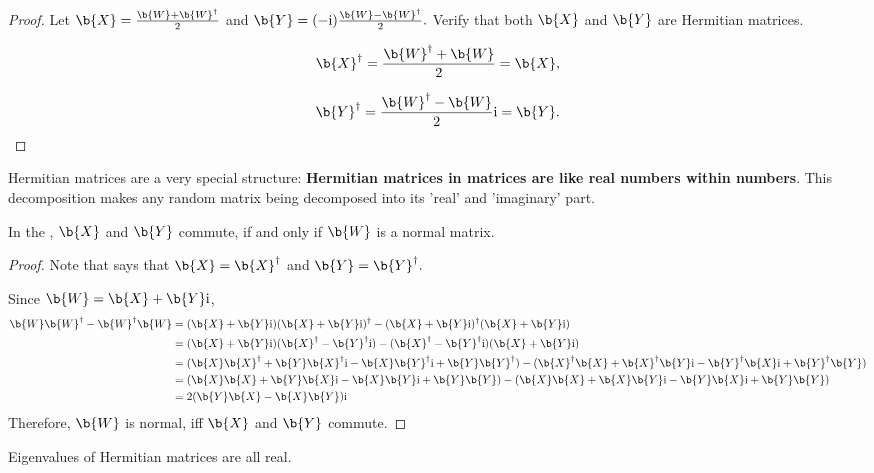 \begin{proof}
Let
$\b{X} = \frac{\b{W} + \b{W}^\dagger}{2}$ and 
$\b{Y} = (- \mathrm{i}) \frac{\b{W} - \b{W}^\dagger}{2}.$
Verify that both $\b{X}$ and $\b{Y}$ are Hermitian matrices.

$$\b{X}^\dagger = \frac{\b{W}^\dagger + \b{W}}{2} = \b{X},$$

$$\b{Y}^\dagger = \frac{\b{W}^\dagger - \b{W}}{2} \mathrm{i} = \b{Y}.$$
\end{proof}

\begin{remark}
Hermitian matrices are a very special structure:
\textbf{Hermitian matrices in matrices are like real numbers within numbers}.
This decomposition makes any random matrix being decomposed into its 'real' and 'imaginary' part.
\end{remark}

\begin{corollary}
In the , $\b{X}$ and $\b{Y}$ commute, if and only if $\b{W}$ is a normal matrix.
\end{corollary}

\begin{proof}
Note that  says that $\b{X} = \b{X}^\dagger$ and $\b{Y} = \b{Y}^\dagger.$

Since $\b{W} = \b{X} + \b{Y} \mathrm{i}$,
%
\begin{align*}
    \b{W}\b{W}^\dagger - \b{W}^\dagger\b{W}
&= (\b{X} + \b{Y} \mathrm{i})(\b{X} + \b{Y} \mathrm{i})^\dagger - (\b{X} + \b{Y} \mathrm{i})^\dagger (\b{X} + \b{Y} \mathrm{i}) \\
&= (\b{X} + \b{Y} \mathrm{i})(\b{X}^\dagger - \b{Y}^\dagger \mathrm{i})- (\b{X}^\dagger - \b{Y}^\dagger \mathrm{i}) (\b{X} + \b{Y} \mathrm{i}) \\
&= (\b{X}\b{X}^\dagger + \b{Y}\b{X}^\dagger \mathrm{i} - \b{X}\b{Y}^\dagger \mathrm{i} + \b{Y}\b{Y}^\dagger)
- (\b{X}^\dagger \b{X} + \b{X}^\dagger \b{Y} \mathrm{i} - \b{Y}^\dagger \b{X} \mathrm{i} + \b{Y}^\dagger \b{Y}) \\
&= (\b{X}\b{X} + \b{Y}\b{X} \mathrm{i} - \b{X}\b{Y} \mathrm{i} + \b{Y}\b{Y})
- (\b{X} \b{X} + \b{X}\b{Y} \mathrm{i} - \b{Y}\b{X} \mathrm{i} + \b{Y} \b{Y}) \\
&= 2 (\b{Y}\b{X} - \b{X}\b{Y}) \mathrm{i}
\end{align*}
%
Therefore, $\b{W}$ is normal, iff $\b{X}$ and $\b{Y}$ commute.
\end{proof}

\begin{corollary}
Eigenvalues of Hermitian matrices are all real.
\end{corollary}

